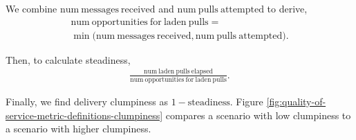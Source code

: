 We combine $\mathrm{num\ messages\ received}$ and $\mathrm{num\ pulls\ attempted}$ to derive,
\begin{align*}
  \mathrm{num\ opportunities\ for\ laden\ pulls} = \\
   \min\Big(\mathrm{num\ messages\ received}, \mathrm{num\ pulls\ attempted}\Big).
\end{align*}

Then, to calculate steadiness,
\begin{align*}
  \frac{
    \mathrm{num\ laden\ pulls\ elapsed}
  }{
    \mathrm{num\ opportunities\ for\ laden\ pulls}
  }.
\end{align*}

Finally, we find delivery clumpiness as $1 - \mathrm{steadiness}$.
Figure \ref{fig:quality-of-service-metric-definitions-clumpiness} compares a scenario with low clumpiness to a scenario with higher clumpiness.
